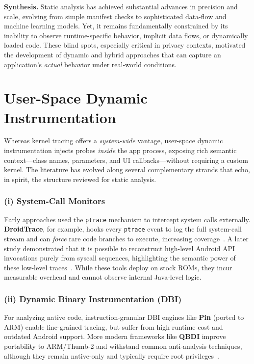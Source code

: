 \documentclass[a4paper,12pt]{report}
\begin{document}
\medskip
\noindent\textbf{Synthesis.}
Static analysis has achieved substantial advances in precision and scale, evolving from simple manifest checks to sophisticated data-flow and machine learning models. Yet, it remains fundamentally constrained by its inability to observe runtime-specific behavior, implicit data flows, or dynamically loaded code. These blind spots, especially critical in privacy contexts, motivated the development of dynamic and hybrid approaches that can capture an application's \emph{actual} behavior under real-world conditions.


\section{User-Space Dynamic Instrumentation}
\label{sec:rw:dynamic:user}

Whereas kernel tracing offers a \emph{system-wide} vantage, user-space dynamic instrumentation injects probes \emph{inside} the app process, exposing rich semantic context—class names, parameters, and UI callbacks—without requiring a custom kernel. The literature has evolved along several complementary strands that echo, in spirit, the structure reviewed for static analysis.

\subsubsection*{(i) System-Call Monitors}
Early approaches used the \texttt{ptrace} mechanism to intercept system calls externally. \textbf{DroidTrace}, for example, hooks every \texttt{ptrace} event to log the full system-call stream and can \emph{force} rare code branches to execute, increasing coverage~\cite{zheng2014droidtrace}. A later study demonstrated that it is possible to reconstruct high-level Android API invocations purely from syscall sequences, highlighting the semantic power of these low-level traces~\cite{nisi2019syscall}. While these tools deploy on stock ROMs, they incur measurable overhead and cannot observe internal Java-level logic.

\subsubsection*{(ii) Dynamic Binary Instrumentation (DBI)}
For analyzing native code, instruction-granular DBI engines like \textbf{Pin} (ported to ARM) enable fine-grained tracing, but suffer from high runtime cost and outdated Android support. More modern frameworks like \textbf{QBDI} improve portability to ARM/Thumb-2 and withstand common anti-analysis techniques, although they remain native-only and typically require root privileges~\cite{qbdiblackhat2020}.
\end{document}
